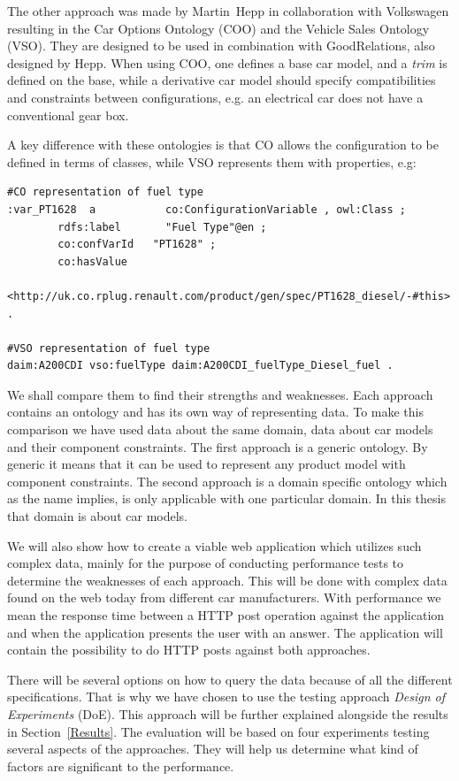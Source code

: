 \documentclass{llncs}
\begin{document}
The other approach was made by Martin~Hepp in collaboration with
Volkswagen resulting in the Car Options Ontology (COO) \cite{COO} and
the Vehicle Sales Ontology (VSO). They are designed to be used in
combination with GoodRelations, also designed by Hepp. When using COO,
one defines a base car model, and a \emph{trim} is defined on the
base, while a derivative car model should specify compatibilities and
constraints between configurations, e.g. an electrical car does not
have a conventional gear box.

A key difference with these ontologies is that CO allows the
configuration to be defined in terms of classes, while VSO
represents them with properties, e.g:
\begin{lstlisting}[basicstyle=\tiny, frame=single]
#CO representation of fuel type
:var_PT1628  a           co:ConfigurationVariable , owl:Class ;
        rdfs:label       "Fuel Type"@en ;
        co:confVarId   "PT1628" ;
        co:hasValue    
	    <http://uk.co.rplug.renault.com/product/gen/spec/PT1628_diesel/-#this> .

#VSO representation of fuel type
daim:A200CDI vso:fuelType daim:A200CDI_fuelType_Diesel_fuel .
\end{lstlisting}



We shall compare them to find their strengths and
weaknesses. Each approach contains an ontology and has its own way of
representing data.  To make this comparison we have used data about
the same domain, data about car models and their component
constraints.  The first approach is a generic ontology. By generic it
means that it can be used to represent any product model with
component constraints. The second approach is a domain specific
ontology which as the name implies, is only applicable with one
particular domain. In this thesis that domain is about car models.

We will also show how to create a viable web application which
utilizes such complex data, mainly for the purpose of conducting
performance tests to determine the weaknesses of each approach. This
will be done with complex data found on the web today from different
car manufacturers.  With performance we mean the response time between
a HTTP post operation against the application and when
the application presents the user with an answer. The application will
contain the possibility to do HTTP posts against both approaches.

There will be several options on how to query the data because of all
the different specifications.  That is why we have chosen to use the
testing approach \emph{Design of Experiments} (DoE). This approach
will be further explained alongside the results in
Section~\ref{Results}. The evaluation will be based on four
experiments testing several aspects of the approaches. They will help
us determine what kind of factors are significant to the performance.
\end{document}
